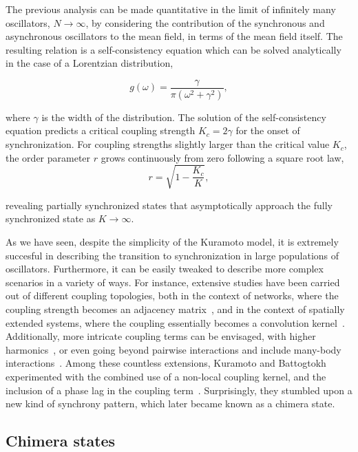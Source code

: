 The previous analysis can be made quantitative in the limit of infinitely many oscillators, $N\to\infty$,
by considering the contribution of the synchronous and
asynchronous oscillators to the mean field, in terms of the mean field itself. 
The resulting relation is a self-consistency equation which can be solved analytically
in the case of a Lorentzian distribution,

\begin{equation}
    g(\omega) = \dfrac{\gamma}{\pi(\omega^2 + \gamma^2)},
\end{equation}

\noindent where $\gamma$ is the width of the distribution. The solution of the self-consistency equation
predicts a critical coupling strength $K_c = 2\gamma$ for the onset of synchronization. For
coupling strengths slightly larger than the critical value $K_c$, the order parameter 
$r$ grows continuously from zero following a square root law, 
$$r = \sqrt{1 - \frac{K_c}{K}},$$

\noindent revealing partially synchronized states that asymptotically approach the fully synchronized state
as $K\to\infty$. 

As we have seen, despite the simplicity of the Kuramoto model, it is extremely succesful
in describing the transition to synchronization in large populations of oscillators. Furthermore,
it can be easily tweaked to describe more complex scenarios in a variety of ways. For instance,
extensive studies have been carried out of different coupling topologies, both in the context
of networks, where the coupling strength becomes an adjacency matrix~\cite{rodrigues2016kuramoto},
and in the context of
spatially extended systems, where the coupling essentially becomes a convolution kernel~\cite{omelchenko2018mathematics}.
Additionally, more intricate coupling terms can be envisaged, with higher harmonics~\cite{daido1996onset}, or
even going beyond pairwise interactions and include many-body interactions~\cite{boccaletti2023structure}. Among these 
countless extensions, Kuramoto and Battogtokh experimented with the combined use of a non-local coupling
kernel, and the inclusion of a phase lag in the coupling term~\cite{kuramoto2002coexistence}. Surprisingly, they stumbled
upon a new kind of synchrony pattern, which later became known as a chimera state.

\subsection{Chimera states}

